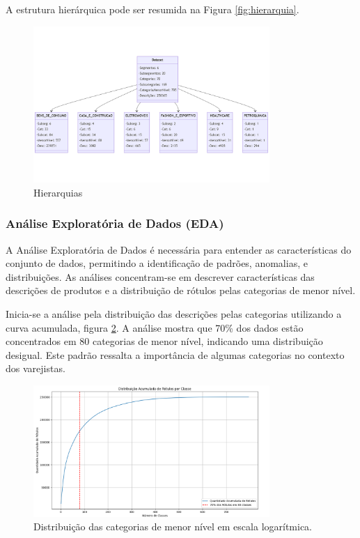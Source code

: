 A estrutura hierárquica pode ser resumida na Figura \ref{fig:hierarquia}.
\begin{figure}[H]
    \centering
    \includegraphics[width=0.8\textwidth]{images/hierarquia.png}
    \caption{Hierarquias}
    \label{fig:hierarquia e quantidade de elementos distintos e descrições em cada segmento}
\end{figure}


\subsubsection{Análise Exploratória de Dados (EDA)}

A Análise Exploratória de Dados é necessária para entender as características do conjunto de dados, permitindo a identificação de padrões, anomalias, e distribuições. As análises concentram-se em descrever características das descrições de produtos e a distribuição de rótulos pelas categorias de menor nível.

Inicia-se a análise pela distribuição das descrições pelas categorias utilizando a curva acumulada, figura \ref{fig:histdistclasses}.  A análise mostra que 70\% dos dados estão concentrados em 80 categorias de menor nível, indicando uma distribuição desigual. Este padrão ressalta a importância de algumas categorias no contexto dos varejistas.
\begin{figure}[H]
    \centering
    \includegraphics[width=0.8\textwidth]{images/histdistclasses.png}
    \caption{Distribuição das categorias de menor nível em escala logarítmica.}
    \label{fig:histdistclasses}
\end{figure}

